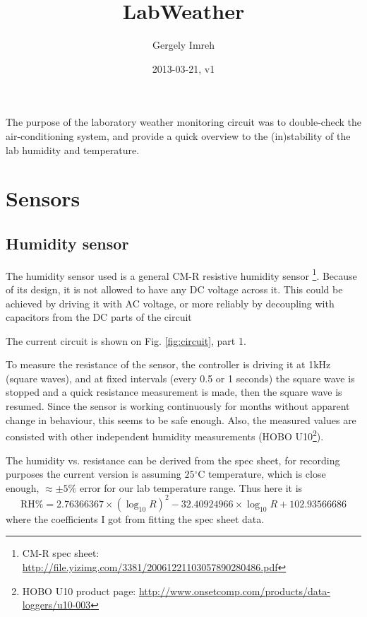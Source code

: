 \documentclass[12pt,a4paper]{article}
\author{Gergely Imreh}
\title{LabWeather}
\date{2013-03-21, v1}
\begin{document}
\maketitle

The purpose of the laboratory weather monitoring circuit was to double-check the air-conditioning system, and provide a quick overview to the (in)stability of the lab humidity and temperature.

\tableofcontents

\section{Sensors}

\subsection{Humidity sensor}

The humidity sensor used is a general CM-R resistive humidity sensor \footnote{CM-R spec sheet: \url{http://file.yizimg.com/3381/20061221103057890280486.pdf}}. Because of its design, it is not allowed to have any DC voltage across it. This could be achieved by driving it with AC voltage, or more reliably by decoupling with capacitors from the DC parts of the circuit

The current circuit is shown on Fig. \ref{fig:circuit}, part 1.

To measure the resistance of the sensor, the controller is driving it at 1kHz (square waves), and at fixed intervals (every 0.5 or 1 seconds) the square wave is stopped and a quick resistance measurement is made, then the square wave is resumed. Since the sensor is working continuously for months without apparent change in behaviour, this seems to be safe enough. Also, the measured values are consisted with other independent humidity measurements (HOBO U10\footnote{HOBO U10 product page: \url{http://www.onsetcomp.com/products/data-loggers/u10-003}}).

The humidity vs. resistance can be derived from the spec sheet, for recording purposes the current version is assuming $25\mathrm{^\circ C}$ temperature, which is close enough, $\approx \pm 5 \% $ error for our lab temperature range. Thus here it is
\begin{equation}
\mathrm{RH\%} =  2.76366367 \times (\log_{10} R) ^ 2 - 32.40924966 \times \log_{10}R + 102.93566686
\end{equation}
where the coefficients I got from fitting the spec sheet data.
\end{document}
